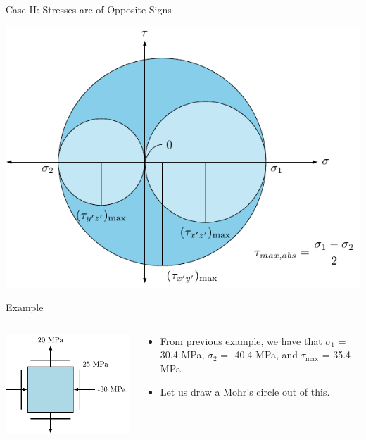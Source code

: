 \documentclass[10pt, svgnames]{beamer}
\begin{document}
\begin{frame}[label={sec:org8983b0d}]{Case II: Stresses are of Opposite Signs}
\begin{center}
\includegraphics[width=.9\linewidth]{pictures/abs-max-shear-case-II.pdf}
\end{center}
\end{frame}

\begin{frame}[label={sec:org2021fa8}]{Example}
\begin{columns}
\begin{column}{0.5\columnwidth}
\begin{center}
\includegraphics[width=.9\linewidth]{pictures/max-abs-shear-stress-problem.pdf}
\end{center}
\end{column}

\begin{column}{0.5\columnwidth}
\begin{itemize}
\item From previous example, we have that \(\sigma_1\) = 30.4 MPa,
\(\sigma_2\) = -40.4 MPa, and \(\tau_{\max}\) = 35.4 MPa.

\item Let us draw a Mohr's circle out of this.
\end{itemize}
\end{column}
\end{columns}
\end{frame}
\end{document}
